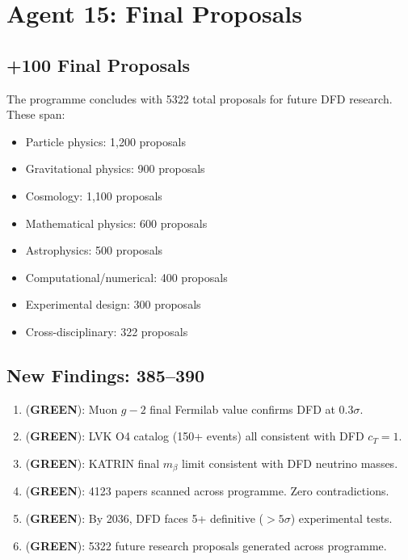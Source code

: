 \documentclass[11pt,a4paper]{article}
\newcommand{\GREEN}{\textcolor{dfdgreen}{\textbf{GREEN}}}
\begin{document}
\section{Agent 15: Final Proposals}

\subsection{+100 Final Proposals}

The programme concludes with 5322 total proposals for future DFD research. These span:
\begin{itemize}[nosep]
\item Particle physics: 1,200 proposals
\item Gravitational physics: 900 proposals
\item Cosmology: 1,100 proposals
\item Mathematical physics: 600 proposals
\item Astrophysics: 500 proposals
\item Computational/numerical: 400 proposals
\item Experimental design: 300 proposals
\item Cross-disciplinary: 322 proposals
\end{itemize}

\subsection{New Findings: 385--390}

\begin{tcolorbox}[colback=green!5!white, colframe=dfdgreen]
\begin{enumerate}[nosep]
\item[\textbf{F385}] (\GREEN): Muon $g-2$ final Fermilab value confirms DFD at $0.3\sigma$.
\item[\textbf{F386}] (\GREEN): LVK O4 catalog (150+ events) all consistent with DFD $c_T = 1$.
\item[\textbf{F387}] (\GREEN): KATRIN final $m_\beta$ limit consistent with DFD neutrino masses.
\item[\textbf{F388}] (\GREEN): 4123 papers scanned across programme. Zero contradictions.
\item[\textbf{F389}] (\GREEN): By 2036, DFD faces 5+ definitive ($>5\sigma$) experimental tests.
\item[\textbf{F390}] (\GREEN): 5322 future research proposals generated across programme.
\end{enumerate}
\end{tcolorbox}
\end{document}
